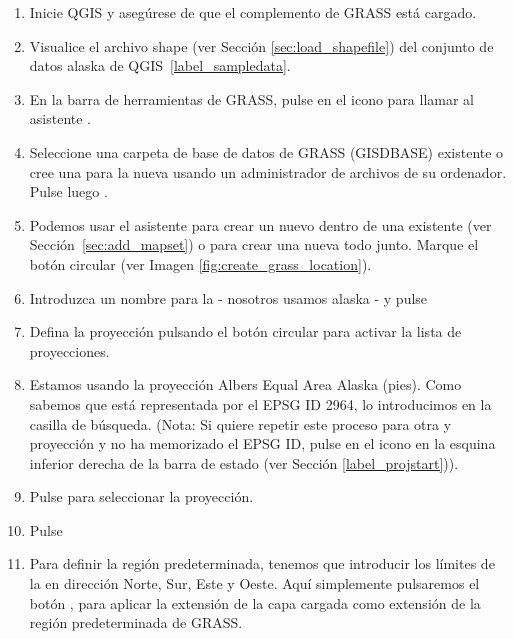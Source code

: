 \begin{enumerate}
  \item Inicie QGIS y asegúrese de que el complemento de GRASS está cargado.
  \item Visualice el archivo shape  (ver Sección
  \ref{sec:load_shapefile}) del conjunto de datos alaska de QGIS~\ref{label_sampledata}.
  \item En la barra de herramientas de GRASS, pulse en el icono  para llamar al asistente .
  \item Seleccione una carpeta de base de datos de GRASS (GISDBASE) existente 
   o cree una para la nueva  usando un administrador de archivos 
  de su ordenador. Pulse luego . 
  \item Podemos usar el asistente para crear un nuevo  dentro de una 
    existente (ver Sección~\ref{sec:add_mapset}) o para crear 
  una nueva  todo junto. Marque el botón circular
   (ver Imagen \ref{fig:create_grass_location}).
  \item Introduzca un nombre para la  - nosotros usamos alaska - y pulse 
  \item Defina la proyección pulsando el botón circular
   para activar la lista de proyecciones.
  \item Estamos usando la proyección Albers Equal Area Alaska (pies). Como sabemos que está representada por el EPSG ID 2964, lo introducimos 
  en la casilla de búsqueda. (Nota: Si quiere repetir este proceso para otra 
   y proyección y no ha memorizado el EPSG ID, 
  pulse en el icono
   en la esquina inferior derecha de la barra de estado (ver Sección \ref{label_projstart})).
  \item Pulse  para seleccionar la proyección.
  \item Pulse  
  \item Para definir la región predeterminada, tenemos que introducir los límites de la  en dirección Norte, Sur, Este y Oeste. 
  Aquí simplemente pulsaremos el botón , para aplicar la extensión de la  
  capa cargada  como extensión de la región predeterminada de GRASS.

\end{enumerate}

